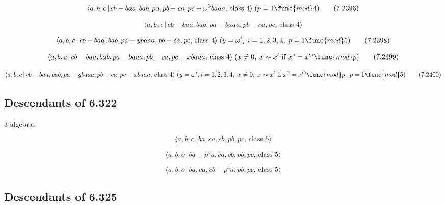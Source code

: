 \documentclass[10pt]{article}
\begin{document}
\begin{equation}
\langle a,b,c\,|\,cb-baa,bab,pa,pb-ca,pc-\omega ^{3}baaa,\,\text{class }%
4\rangle \;(p=1\func{mod}4)  \tag{7.2396}
\end{equation}

\begin{equation}
\langle a,b,c\,|\,cb-baa,bab,pa-baaa,pb-ca,pc,\,\text{class }4\rangle 
\tag{7.2397}
\end{equation}

\begin{equation}
\langle a,b,c\,|\,cb-baa,bab,pa-ybaaa,pb-ca,pc,\,\text{class }4\rangle
\;(y=\omega ^{i},\;i=1,2,3,4,\;p=1\func{mod}5)  \tag{7.2398}
\end{equation}

\begin{equation}
\langle a,b,c\,|\,cb-baa,bab,pa-baaa,pb-ca,pc-xbaaa,\,\text{class }4\rangle
\;(x\neq 0,\;x\sim x^{\prime }\text{ if }x^{5}=x^{\prime 5}\func{mod}p) 
\tag{7.2399}
\end{equation}

\begin{equation}
\langle a,b,c\,|\,cb-baa,bab,pa-ybaaa,pb-ca,pc-xbaaa,\,\text{class }4\rangle
\;(y=\omega ^{i},i=1,2,3,4,\;x\neq 0,\;x\sim x^{\prime }\text{ if }%
x^{5}=x^{\prime 5}\func{mod}p,\;p=1\func{mod}5)  \tag{7.2400}
\end{equation}

\subsection{Descendants of 6.322}

3 algebras

\begin{equation}
\langle a,b,c\,|\,ba,ca,cb,pb,pc,\,\text{class }5\rangle  \tag{7.2401}
\end{equation}

\begin{equation}
\langle a,b,c\,|\,ba-p^4a,ca,cb,pb,pc,\,\text{class }5\rangle  \tag{7.2402}
\end{equation}

\begin{equation}
\langle a,b,c\,|\,ba,ca,cb-p^4a,pb,pc,\,\text{class }5\rangle  \tag{7.2403}
\end{equation}

\subsection{Descendants of 6.325}
\end{document}

